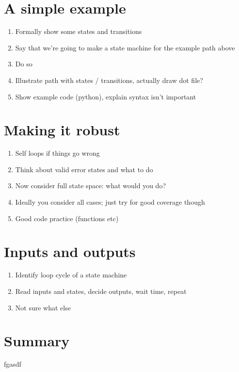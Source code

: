 \documentclass[a4paper,10pt]{article}
\begin{document}
\section{A simple example}
\begin{enumerate}
\item Formally show some states and transitions
\item Say that we're going to make a state machine for the example path above
\item Do so
\item Illustrate path with states / transitions, actually draw dot file?
\item Show example code (python), explain syntax isn't important
\end{enumerate}

\section{Making it robust}
\begin{enumerate}
\item Self loops if things go wrong
\item Think about valid error states and what to do
\item Now consider full state space: what would you do?
\item Ideally you consider all cases; just try for good coverage though
\item Good code practice (functions etc)
\end{enumerate}

\section{Inputs and outputs}
\begin{enumerate}
\item Identify loop cycle of a state machine
\item Read inputs and states, decide outputs, wait time, repeat
\item Not sure what else
\end{enumerate}

\section{Summary}
fgasdf
\end{document}
